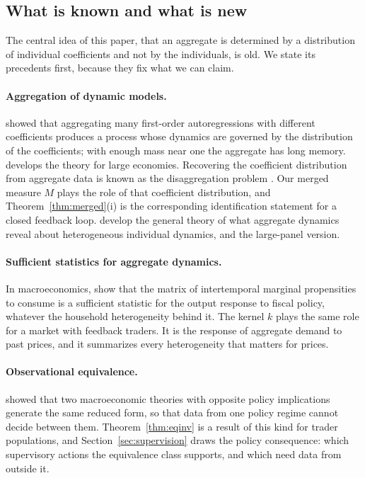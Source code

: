 \documentclass[12pt]{article}
\theoremstyle{definition}
\theoremstyle{remark}
\begin{document}
\subsection{What is known and what is new}\label{sec:lit}

The central idea of this paper, that an aggregate is determined by a distribution of individual coefficients and not by the individuals, is old. We state its precedents first, because they fix what we can claim.

\paragraph{Aggregation of dynamic models.} \citet{granger1980} showed that aggregating many first-order autoregressions with different coefficients produces a process whose dynamics are governed by the distribution of the coefficients; with enough mass near one the aggregate has long memory. \citet{zaffaroni2004} develops the theory for large economies. Recovering the coefficient distribution from aggregate data is known as the disaggregation problem \citep{celov2008}. Our merged measure $M$ plays the role of that coefficient distribution, and Theorem~\ref{thm:merged}(i) is the corresponding identification statement for a closed feedback loop. \citet{forni1997} develop the general theory of what aggregate dynamics reveal about heterogeneous individual dynamics, and \citet{pesaran2014} the large-panel version.

\paragraph{Sufficient statistics for aggregate dynamics.} In macroeconomics, \citet{auclert2024} show that the matrix of intertemporal marginal propensities to consume is a sufficient statistic for the output response to fiscal policy, whatever the household heterogeneity behind it. The kernel $k$ plays the same role for a market with feedback traders. It is the response of aggregate demand to past prices, and it summarizes every heterogeneity that matters for prices.

\paragraph{Observational equivalence.} \citet{sargent1976} showed that two macroeconomic theories with opposite policy implications generate the same reduced form, so that data from one policy regime cannot decide between them. Theorem~\ref{thm:eqinv} is a result of this kind for trader populations, and Section~\ref{sec:supervision} draws the policy consequence: which supervisory actions the equivalence class supports, and which need data from outside it.
\end{document}

